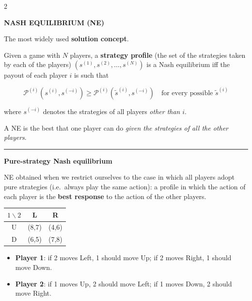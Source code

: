 \documentclass[a4paper,9pt]{extarticle}
\newcommand{\separator}{
\vspace{2pt}
\hrule
\vspace{3pt}
}
\begin{document}
\begin{multicols}{2}
\begin{definition}
\textbf{NASH EQUILIBRIUM (NE)}

The most widely used \textbf{solution concept}.

Given a game with $N$ players, a \textbf{strategy profile} (the set of the strategies taken
by each of the players) $(s^{(1)}, s^{(2)}, \dots, s^{(N)})$ is a Nash equilibrium iff the
payout of each player $i$ is such that

\[
\mathcal{P}^{(i)}(s^{(i)}, s^{(-i)}) \ge \mathcal{P}^{(i)}(\tilde{s}^{(i)}, s^{(-i)})
\quad \text{for every possible } \tilde{s}^{(i)}
\]

where $s^{(-i)}$ denotes the strategies of all players \emph{other than} $i$.

\end{definition}


\begin{important}

A NE is the best that one player can do \emph{given the strategies of all the other
players}.

\end{important}


\separator


\textbf{Pure-strategy Nash equilibrium}

NE obtained when we restrict ourselves to the case in which all players adopt pure strategies
(i.e.\ always play the same action): a profile in which the action of each player is the
\textbf{best response} to the action of the other players.


\begin{example}

\begin{center}
\begin{tabular}{c|cc}
$1 \backslash 2$ & L & R \\
\hline
U & (8,7) & (4,6) \\
D & (6,5) & (7,8) \\
\end{tabular}
\end{center}

\begin{itemize}

\item \textbf{Player 1}: if 2 moves Left, 1 should move Up; if 2 moves Right, 1 should
move Down.

\item \textbf{Player 2}: if 1 moves Up, 2 should move Left; if 1 moves Down, 2 should
move Right.

\end{itemize}


\end{example}
\end{multicols}
\end{document}
